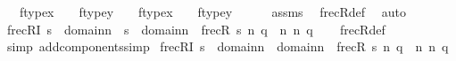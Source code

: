 \begin{isabellebody}
\ \ \ {\isachardoublequoteopen}{\isacharparenleft}{\kern0pt}ftype{\isacharparenleft}{\kern0pt}x{\isacharparenright}{\kern0pt}\ {\isacharequal}{\kern0pt}\ {}\ {\isasymand}\ ftype{\isacharparenleft}{\kern0pt}y{\isacharparenright}{\kern0pt}\ {\isacharequal}{\kern0pt}\ {}{\isacharparenright}{\kern0pt}\ {\isasymor}\ {\isacharparenleft}{\kern0pt}ftype{\isacharparenleft}{\kern0pt}x{\isacharparenright}{\kern0pt}\ {\isacharequal}{\kern0pt}\ {}\ {\isasymand}\ ftype{\isacharparenleft}{\kern0pt}y{\isacharparenright}{\kern0pt}\ {\isacharequal}{\kern0pt}\ {}{\isacharparenright}{\kern0pt}{\isachardoublequoteclose}\isanewline
%
\isadelimproof
\ \ %
\endisadelimproof
%
\isatagproof
{}\isamarkupfalse%
\ assms\ \isamarkupfalse%
\ frecR{\isacharunderscore}{\kern0pt}def\ \isamarkupfalse%
\ auto%
\endisatagproof
{\isafoldproof}%
%
\isadelimproof
\isanewline
%
\endisadelimproof
\isanewline
{}\isamarkupfalse%
\ frecRI{}{\isacharcolon}{\kern0pt}\ {\isachardoublequoteopen}s\ {\isasymin}\ domain{\isacharparenleft}{\kern0pt}n{}{\isacharparenright}{\kern0pt}\ {\isasymor}\ s\ {\isasymin}\ domain{\isacharparenleft}{\kern0pt}n{}{\isacharparenright}{\kern0pt}\ {\isasymLongrightarrow}\ frecR{\isacharparenleft}{\kern0pt}{\isasymlangle}{}{\isacharcomma}{\kern0pt}\ s{\isacharcomma}{\kern0pt}\ n{}{\isacharcomma}{\kern0pt}\ q{\isasymrangle}{\isacharcomma}{\kern0pt}\ {\isasymlangle}{}{\isacharcomma}{\kern0pt}\ n{}{\isacharcomma}{\kern0pt}\ n{}{\isacharcomma}{\kern0pt}\ q{\isacharprime}{\kern0pt}{\isasymrangle}{\isacharparenright}{\kern0pt}{\isachardoublequoteclose}\isanewline
%
\isadelimproof
\ \ %
\endisadelimproof
%
\isatagproof
{}\isamarkupfalse%
\ frecR{\isacharunderscore}{\kern0pt}def\ \isamarkupfalse%
\ {\isacharparenleft}{\kern0pt}simp\ add{\isacharcolon}{\kern0pt}components{\isacharunderscore}{\kern0pt}simp{\isacharparenright}{\kern0pt}%
\endisatagproof
{\isafoldproof}%
%
\isadelimproof
\isanewline
%
\endisadelimproof
\isanewline
{}\isamarkupfalse%
\ frecRI{}{\isacharprime}{\kern0pt}{\isacharcolon}{\kern0pt}\ {\isachardoublequoteopen}s\ {\isasymin}\ domain{\isacharparenleft}{\kern0pt}n{}{\isacharparenright}{\kern0pt}\ {\isasymunion}\ domain{\isacharparenleft}{\kern0pt}n{}{\isacharparenright}{\kern0pt}\ {\isasymLongrightarrow}\ frecR{\isacharparenleft}{\kern0pt}{\isasymlangle}{}{\isacharcomma}{\kern0pt}\ s{\isacharcomma}{\kern0pt}\ n{}{\isacharcomma}{\kern0pt}\ q{\isasymrangle}{\isacharcomma}{\kern0pt}\ {\isasymlangle}{}{\isacharcomma}{\kern0pt}\ n{}{\isacharcomma}{\kern0pt}\ n{}{\isacharcomma}{\kern0pt}\ q{\isacharprime}{\kern0pt}{\isasymrangle}{\isacharparenright}{\kern0pt}{\isachardoublequoteclose}\isanewline

\end{isabellebody}
